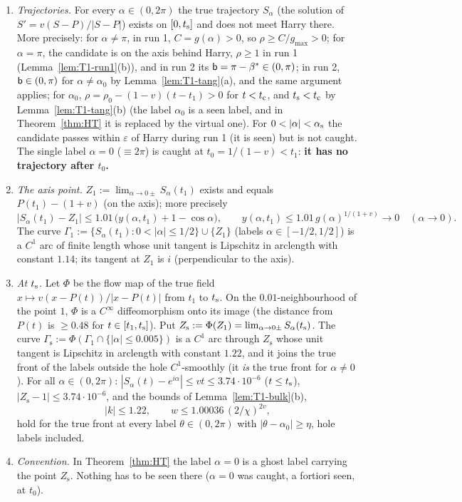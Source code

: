 \begin{lemma}\label{lem:T1-hole}
\begin{enumerate}
\item[(a)] \emph{Trajectories.} For every $\alpha\in(0,2\pi)$ the true trajectory $S_\alpha$ (the solution of
$S'=v(S-P)/|S-P|$) exists on $[0,t_{\mathrm s}]$ and does not meet Harry there. More precisely: for $\alpha\ne\pi$, in run 1, $C=g(\alpha)>0$, so $\rho\ge C/g_{\max}>0$; for $\alpha=\pi$, the
candidate is on the axis behind Harry, $\rho\ge1$ in run 1 (Lemma~\ref{lem:T1-run1}(b)), and in run 2 its $\mathsf b=\pi-\beta^*\in(0,\pi)$; in
run 2, $\mathsf b\in(0,\pi)$ for $\alpha\ne\alpha_0$ by Lemma~\ref{lem:T1-tang}(a), and the same argument applies; for $\alpha_0$,
$\rho=\rho_0-(1-v)(t-t_1)>0$ for $t<t_{\mathrm c}$, and $t_{\mathrm s}<t_{\mathrm c}$ by Lemma~\ref{lem:T1-tang}(b) (the label $\alpha_0$ is a seen label, and in
Theorem~\ref{thm:HT} it is replaced by the virtual one). For $0<|\alpha|<\STas$ the candidate passes within $\varepsilon$ of Harry during run 1 (it is seen) but is not caught.
The single label $\alpha=0$ ($\equiv2\pi$) is caught at $t_0=1/(1-v)<t_1$: \textbf{it has no trajectory after $t_0$.}
\item[(b)] \emph{The axis point.} $Z_1:=\lim_{\alpha\to0\pm}S_\alpha(t_1)$ exists and equals $P(t_1)-(1+v)$ (on the axis); more precisely
\[
|S_\alpha(t_1)-Z_1|\le1.01\,\bigl(y(\alpha,t_1)+1-\cos\alpha\bigr),\qquad y(\alpha,t_1)\le1.01\,g(\alpha)^{1/(1+v)}\to0\quad(\alpha\to0).
\]
The curve $\Gamma_1:=\{S_\alpha(t_1):0<|\alpha|\le1/2\}\cup\{Z_1\}$ (labels $\alpha\in[-1/2,1/2]$) is a $C^1$ arc of finite length whose
unit tangent is Lipschitz in arclength with constant $1.14$; its tangent at $Z_1$ is $i$ (perpendicular to the axis).
\item[(c)] \emph{At $t_{\mathrm s}$.} Let $\Phi$ be the flow map of the true field $x\mapsto v(x-P(t))/|x-P(t)|$ from $t_1$ to $t_{\mathrm s}$. On the
$0.01$-neighbourhood of the point $1$, $\Phi$ is a $C^\infty$ diffeomorphism onto its image (the distance from $P(t)$ is $\ge0.48$ for
$t\in[t_1,t_{\mathrm s}]$). Put $Z_{\mathrm s}:=\Phi(Z_1)=\lim_{\alpha\to0\pm}S_\alpha(t_{\mathrm s})$. The curve
$\Gamma_{\mathrm s}:=\Phi(\Gamma_1\cap\{|\alpha|\le0.005\})$ is a $C^1$ arc through $Z_{\mathrm s}$ whose unit tangent is Lipschitz in
arclength with constant $1.22$, and it joins the true front of the labels outside the hole $C^1$-smoothly (it \emph{is} the true front
for $\alpha\ne0$). For all $\alpha\in(0,2\pi)$: $|S_\alpha(t)-e^{i\alpha}|\le vt\le3.74\cdot10^{-6}$ ($t\le t_{\mathrm s}$),
$|Z_{\mathrm s}-1|\le3.74\cdot10^{-6}$, and the bounds of Lemma~\ref{lem:T1-bulk}(b),
\[
|k|\le1.22,\qquad w\le1.00036\,(2/\chi)^{2v},
\]
hold for the true front at every label $\theta\in(0,2\pi)$ with $|\theta-\alpha_0|\ge\eta$, hole labels included.
\item[(d)] \emph{Convention.} In Theorem~\ref{thm:HT} the label $\alpha=0$ is a ghost label carrying the point $Z_{\mathrm s}$. Nothing
has to be seen there ($\alpha=0$ was caught, a fortiori seen, at $t_0$).
\end{enumerate}
\end{lemma}

